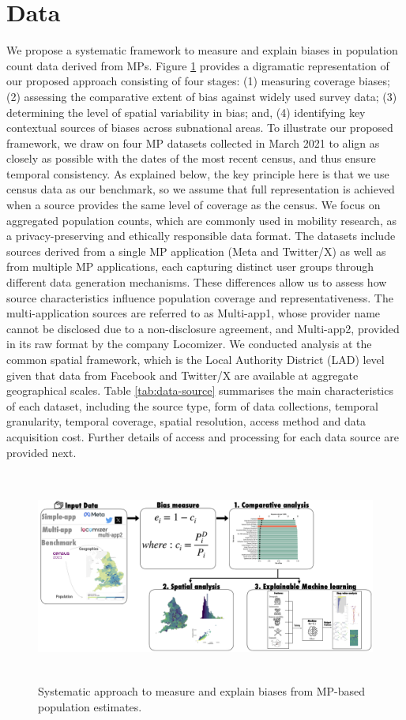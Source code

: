 \documentclass[]{rsos}%
\begin{document}
\section{Data}\label{sec-data}

We propose a systematic framework to measure and explain biases in
population count data derived from MPs. Figure
\ref{fig:debias-approach} provides a digramatic representation of our
proposed approach consisting of four stages: (1) measuring coverage
biases; (2) assessing the comparative extent of bias against widely used
survey data; (3) determining the level of spatial variability in bias;
and, (4) identifying key contextual sources of biases across subnational
areas. To illustrate our proposed framework, we draw on four MP datasets
collected in March 2021 to align as closely as possible with the dates
of the most recent census, and thus ensure temporal consistency. As
explained below, the key principle here is that we use census data as
our benchmark, so we assume that full representation is achieved when a
source provides the same level of coverage as the census. We focus on
aggregated population counts, which are commonly used in mobility
research, as a privacy-preserving and ethically responsible data format.
The datasets include sources derived from a single MP application (Meta
and Twitter/X) as well as from multiple MP applications, each capturing
distinct user groups through different data generation mechanisms. These
differences allow us to assess how source characteristics influence
population coverage and representativeness. The multi-application
sources are referred to as Multi-app1, whose provider name cannot be
disclosed due to a non-disclosure agreement, and Multi-app2, provided in
its raw format by the company Locomizer. We conducted analysis at the common spatial framework, which is the Local Authority District (LAD) level given that data from Facebook and Twitter/X are available at aggregate geographical scales. Table
\ref{tab:data-source} summarises the main characteristics of each
dataset, including the source type, form of data collections, temporal
granularity, temporal coverage, spatial resolution, access method and
data acquisition cost. Further details of access and processing for each
data source are provided next.

\begin{figure}
\centering
\includegraphics[width=14cm,height=7cm]{figures/debias-approach.png}
\caption{Systematic approach to measure and explain biases from MP-based
population estimates.}\label{fig:debias-approach}
\end{figure}
\end{document}
